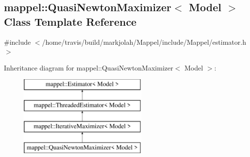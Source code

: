 \hypertarget{classmappel_1_1QuasiNewtonMaximizer}{}\subsection{mappel\+:\+:Quasi\+Newton\+Maximizer$<$ Model $>$ Class Template Reference}
\label{classmappel_1_1QuasiNewtonMaximizer}


{\ttfamily \#include $<$/home/travis/build/markjolah/\+Mappel/include/\+Mappel/estimator.\+h$>$}

Inheritance diagram for mappel\+:\+:Quasi\+Newton\+Maximizer$<$ Model $>$\+:\begin{figure}[H]
\begin{center}
\leavevmode
\includegraphics[height=4.000000cm]{classmappel_1_1QuasiNewtonMaximizer}
\end{center}
\end{figure}
